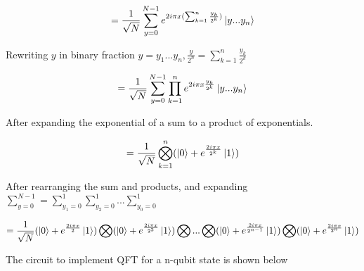 \documentclass{article}
\begin{document}
\vspace{5mm}

\begin{equation}
=  \frac{1}{\sqrt{N}} \sum\limits_{y=0}^{N-1}e^{2i\pi x(\sum_{k=1}^{n}\frac{y_k}{2^k})}\ket{y...y_n} 
\end{equation}
\vspace{5mm}

Rewriting $y$ in binary fraction $y= y_1 ... y_n, \frac{y}{2^n} = \sum\limits_{k=1}^{n}\frac{y_k}{2^k}$   
\vspace{5mm}

\begin{equation}
= \frac{1}{\sqrt{N}} \sum\limits_{y=0}^{N-1}\prod\limits_{k=1}^{n}e^{2i\pi x\frac{y_k}{2^k}}\ket{y...y_n}    
\end{equation}
\vspace{5mm}

\noindent
After expanding the exponential of a sum to a product of exponentials.
\vspace{5mm}

\begin{equation}
= \frac{1}{\sqrt{N}}\bigotimes\limits_{k=1}^{n}(\ket{0} + e^{\frac{2i\pi x}{2^k}}\ket{1})  
\end{equation}
\vspace{5mm}

\noindent
After rearranging the sum and products, and expanding $\sum\limits_{y=0}^{N-1} = \sum\limits_{y_1=0}^{1}\sum\limits_{y_2=0}^{1}...\sum\limits_{y_0=0}^{1} $
\vspace{5mm}

\begin{equation}
= \frac{1}{\sqrt{N}}(\ket{0} + e^{\frac{2i\pi x}{2}}\ket{1}) \bigotimes (\ket{0} + e^{\frac{2i\pi x}{2^2}}\ket{1}) \bigotimes ... \bigotimes(\ket{0} + e^{\frac{2i\pi x}{2^{n-1}}}\ket{1}) \bigotimes (\ket{0} + e^{\frac{2i\pi x}{2^n}}\ket{1})    
\end{equation}
\pagebreak

The circuit to implement QFT for a n-qubit state is shown below
\vspace{5mm}

\noindent
\end{document}
